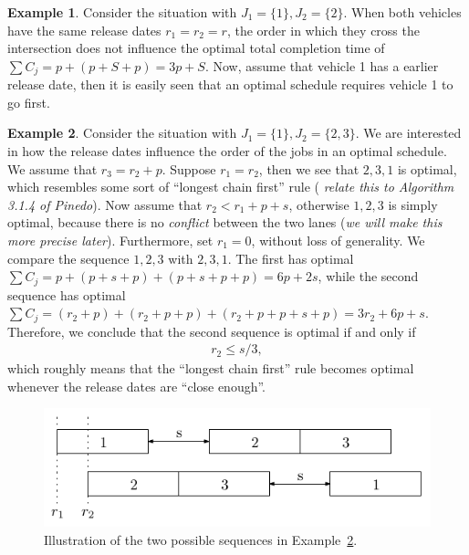 \documentclass{article}
\theoremstyle{definition}
\newtheorem{eg}{Example}[section]
\theoremstyle{plain}
\begin{document}
\begin{eg}
  Consider the situation with $J_{1} = \{ 1 \}, J_{2} = \{ 2 \}$. When both
  vehicles have the same release dates $r_{1} = r_{2} = r$, the order in which
  they cross the intersection does not influence the optimal total completion
  time of $\sum C_{j} = p + (p + S + p) = 3p + S$. Now, assume that vehicle 1
  has a earlier release date, then it is easily seen that an optimal schedule
  requires vehicle 1 to go first.
\end{eg}
%
\begin{eg}
  \label{example2}
  Consider the situation with $J_{1} = \{ 1 \}, J_{2} = \{ 2, 3 \}$. We are
  interested in how the release dates influence the order of the jobs in an
  optimal schedule. We assume that $r_{3} = r_{2} + p$. Suppose $r_{1} = r_{2}$,
  then we see that $2, 3, 1$ is optimal, which resembles some sort of ``longest
  chain first'' rule (\textit{\color{blue} relate this to Algorithm 3.1.4 of
    Pinedo}). Now assume that $r_{2} < r_{1} + p + s$, otherwise $1, 2, 3$ is
  simply optimal, because there is no \textit{conflict} between the two lanes
  (\textit{\color{blue}we will make this more precise later}). Furthermore, set
  $r_{1} = 0$, without loss of generality. We compare the sequence $1, 2, 3$
  with $2, 3, 1$. The first has optimal
  $\sum C_{j} = p + (p+s+p) + (p+s+p+p) = 6p + 2s$, while the second sequence
  has optimal
  $\sum C_{j} = (r_{2} + p) + (r_{2} + p + p) + (r_{2} + p + p + s + p) = 3 r_{2} + 6p + s$.
  Therefore, we conclude that the second sequence is optimal if and only if
  \begin{align*}
    r_{2} \leq s/3 ,
  \end{align*}
  which roughly means that the ``longest chain first'' rule becomes optimal
  whenever the release dates are ``close enough''.
\end{eg}
%
\begin{figure}
  \centering
  \includegraphics{123.pdf}
  \caption{Illustration of the two possible sequences in Example~\ref{example2}.}
  \label{fig:example2}
\end{figure}
\end{document}
